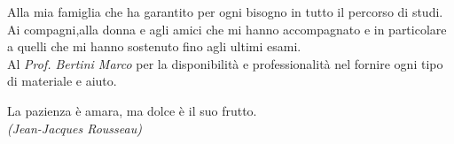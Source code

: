 \documentclass[11pt]{toptesi}
\makeatletter
\newcommand\listofcodes{%
 \iffrontmatter\else\frontmattertrue\fi
 \if@openright\cleardoublepage\else\clearpage\fi
 \begingroup\def\chapter##1{\@schapter}
 \phantomsection %
 \lstlistoflistings 
 \endgroup
}
\makeatother
\begin{document}
\frontespizio



\frontmatter

\begin{flushright}
\noindent
Alla mia famiglia che ha garantito per ogni bisogno in tutto il percorso di studi.\\
\vspace{1cm}
Ai compagni,alla donna e agli amici che mi hanno accompagnato e in particolare a quelli che mi hanno sostenuto fino agli ultimi esami. \\
\vspace{1cm}
Al \textit{Prof. Bertini Marco} per la disponibilità e professionalità nel fornire ogni tipo di materiale e aiuto.
\end{flushright}
\cleardoublepage


\begin{flushright}
\noindent
La pazienza è amara, ma dolce è il suo frutto. \\
\textit{(Jean-Jacques Rousseau)}
\end{flushright}
\cleardoublepage










\mainmatter





\nocite{*}
\printbibliography
\end{document}
